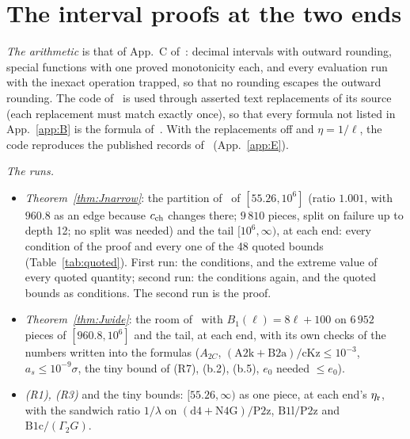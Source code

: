 \section{The interval proofs at the two ends}
\label{app:D}

\emph{The arithmetic} is that of App.~C of~\cite{I}: decimal intervals with outward rounding, special functions with one proved monotonicity each, and every evaluation run with the inexact operation trapped, so that no rounding escapes the outward rounding.
The code of~\cite{I} is used through asserted text replacements of its source (each replacement must match exactly once), so that every formula not listed in App.~\ref{app:B} is the formula of~\cite{I}.
With the replacements off and $\eta=1/\ell$, the code reproduces the published records of~\cite{I} (App.~\ref{app:E}).

\emph{The runs.}
\begin{itemize}
\item \emph{Theorem~\ref{thm:Jnarrow}}: the partition of~\cite{I} of $[55.26,10^6]$ (ratio $1.001$, with $960.8$ as an edge because $c_{\rm ch}$ changes there; $9\,810$ pieces, split on failure up to depth 12; no split was needed) and the tail $[10^6,\infty)$, at each end: every condition of the proof and every one of the 48 quoted bounds (Table~\ref{tab:quoted}).
  First run: the conditions, and the extreme value of every quoted quantity; second run: the conditions again, and the quoted bounds as conditions. The second run is the proof.
\item \emph{Theorem~\ref{thm:Jwide}}: the room of~\cite{I} with $B_1(\ell)=8\ell+100$ on $6\,952$ pieces of $[960.8,10^6]$ and the tail, at each end, with its own checks of the numbers written into the formulas ($A_{2C}$, $(\mathrm{A2k}+\mathrm{B2a})/\mathrm{cKz}\le10^{-3}$, $a_s\le10^{-9}\sigma$, the tiny bound of (R7), (b.2), (b.5), $e_0$ needed $\le e_0$).
\item \emph{(R1), (R3)} and the tiny bounds: $[55.26,\infty)$ as one piece, at each end's $\eta_{\rm r}$, with the sandwich ratio $1/\lambda$ on $(\mathrm{d4}+\mathrm{N4G})/\mathrm{P2z}$, $\mathrm{B1l}/\mathrm{P2z}$ and $\mathrm{B1c}/(\Gamma_2G)$.
\end{itemize}

